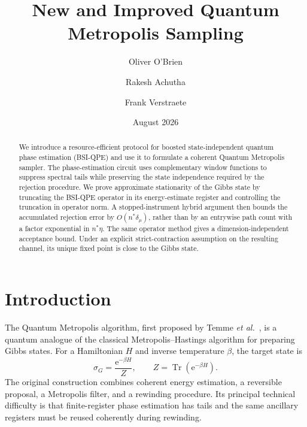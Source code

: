 \documentclass[aps,floatfix,10pt,amssymb,amsmath,superscriptaddress,nofootinbib,longbibliography,nobalancelastpage,twocolumn]{revtex4-2}
\date{August 2026}
\newcommand{\Tr}{\operatorname{Tr}}
\newcommand{\e}{\mathrm{e}}
\begin{document}
\title{New and Improved Quantum Metropolis Sampling}
\author{Oliver O'Brien}
\author{Rakesh Achutha}
\author{Frank Verstraete}

\begin{abstract}
We introduce a resource-efficient protocol for boosted state-independent quantum phase estimation (BSI-QPE) and use it to formulate a coherent Quantum Metropolis sampler.  The phase-estimation circuit uses complementary window functions to suppress spectral tails while preserving the state independence required by the rejection procedure.  We prove approximate stationarity of the Gibbs state by truncating the BSI-QPE operator in its energy-estimate register and controlling the truncation in operator norm.  A stopped-instrument hybrid argument then bounds the accumulated rejection error by $O(n^*\delta_\mu)$, rather than by an entrywise path count with a factor exponential in $n^*\eta$.  The same operator method gives a dimension-independent acceptance bound.  Under an explicit strict-contraction assumption on the resulting channel, its unique fixed point is close to the Gibbs state.
\end{abstract}

\maketitle

\section{Introduction}

The Quantum Metropolis algorithm, first proposed by Temme \emph{et al.}~\cite{Temme_2011}, is a quantum analogue of the classical Metropolis--Hastings algorithm for preparing Gibbs states.  For a Hamiltonian $H$ and inverse temperature $\beta$, the target state is
\begin{equation}
    \sigma_G=\frac{\e^{-\beta H}}{Z},\qquad
    Z=\Tr(\e^{-\beta H}).
    \label{eq:gibbs}
\end{equation}
The original construction combines coherent energy estimation, a reversible proposal, a Metropolis filter, and a rewinding procedure.  Its principal technical difficulty is that finite-register phase estimation has tails and the same ancillary registers must be reused coherently during rewinding.
\end{document}
